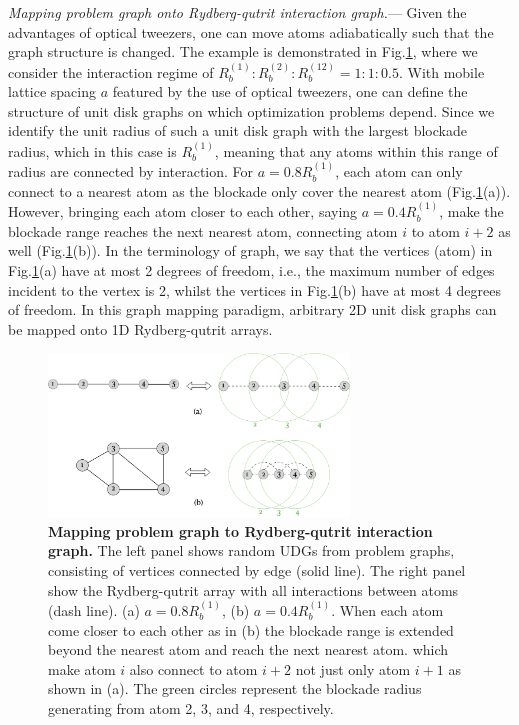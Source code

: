 \documentclass[%
 reprint,
nofootinbib,
 amsmath,amssymb,
 aps,
pra,
floatfix,
]{revtex4-2}
\begin{document}
\emph{Mapping problem graph onto Rydberg-qutrit interaction graph.}--- Given the advantages of optical tweezers, one can move atoms adiabatically such that the graph structure is changed. The example is demonstrated in Fig.\ref{fig:graph_mapping}, where we consider the interaction regime of $R^{(1)}_b:R^{(2)}_b:R^{(12)}_b=1:1:0.5$. With mobile lattice spacing $a$ featured by the use of optical tweezers, one can define the structure of unit disk graphs on which optimization problems depend. Since we identify the unit radius of such a unit disk graph with the largest blockade radius, which in this case is $R^{(1)}_b$, meaning that any atoms within this range of radius are connected by interaction. For $a = 0.8R^{(1)}_b$, each atom can only connect to a nearest atom as the blockade only cover the nearest atom (Fig.\ref{fig:graph_mapping}(a)). However, bringing each atom closer to each other, saying $a = 0.4R^{(1)}_b$, make the blockade range reaches the next nearest atom, connecting atom $i$ to atom $i+2$ as well (Fig.\ref{fig:graph_mapping}(b)). In the terminology of graph, we say that the vertices (atom) in Fig.\ref{fig:graph_mapping}(a) have at most 2 degrees of freedom, i.e., the maximum number of edges incident to the vertex is 2, whilst the vertices in Fig.\ref{fig:graph_mapping}(b) have at most 4 degrees of freedom. In this graph mapping paradigm, arbitrary 2D unit disk graphs can be mapped onto 1D Rydberg-qutrit arrays. 
\begin{figure}[ht!]
    \centering
    \includegraphics[width=8cm]{picture/graph_mapping.png}
    \caption{\textbf{Mapping problem graph to Rydberg-qutrit interaction graph.} The left panel shows random UDGs from problem graphs, consisting of vertices connected by edge (solid line). The right panel show the Rydberg-qutrit array with all interactions between atoms (dash line). (a) $a = 0.8R^{(1)}_b$,  (b) $a=0.4R^{(1)}_b$. When each atom come closer to each other as in (b) the blockade range is extended beyond the nearest atom and reach the next nearest atom. which make atom $i$ also connect to atom $i+2$ not just only atom $i+1$ as shown in (a). The green circles represent the blockade radius generating from atom 2, 3, and 4, respectively.}
    \label{fig:graph_mapping}
\end{figure}
\end{document}
